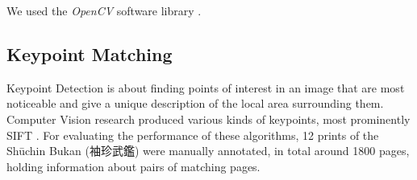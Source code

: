 \documentclass{ltjarticle}
\begin{document}
We used the \emph{OpenCV} software library \cite{opencv_library}.

\subsection{Keypoint Matching}

Keypoint Detection \cite[Ch.4]{szeliski2010computer} is about finding points of interest in an image that are most noticeable and give a unique description of the local area surrounding them. Computer Vision research produced various kinds of keypoints, most prominently SIFT \cite{lowe2004sift}. For evaluating the performance of these algorithms, 12 prints of the Shūchin Bukan (袖珍武鑑) were manually annotated, in total around 1800 pages, holding information about pairs of matching pages.
\end{document}
